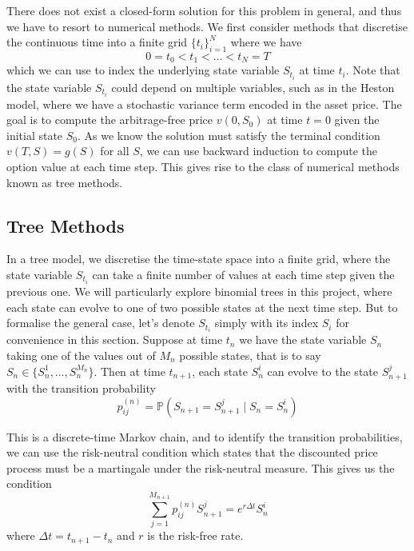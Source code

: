 There does not exist a closed-form solution for this problem in general, and thus we have to resort to numerical methods. We first consider methods that discretise the continuous time into a finite grid $\{t_i\}_{i=1}^N$ where we have
\begin{equation}
    0 = t_0 < t_1 < \dots < t_N = T
\end{equation}
which we can use to index the underlying state variable $S_{t_i}$ at time $t_i$. Note that the state variable $S_{t_i}$ could depend on multiple variables, such as in the Heston model, where we have a stochastic variance term encoded in the asset price. The goal is to compute the arbitrage-free price $v(0, S_0)$ at time $t=0$ given the initial state $S_0$. As we know the solution must satisfy the terminal condition $v(T, S) = g(S)$ for all $S$, we can use backward induction to compute the option value at each time step. This gives rise to the class of numerical methods known as tree methods.

\subsection{Tree Methods}

In a tree model, we discretise the time-state space into a finite grid, where the state variable $S_{t_i}$ can take a finite number of values at each time step given the previous one. We will particularly explore binomial trees in this project, where each state can evolve to one of two possible states at the next time step. But to formalise the general case, let's denote $S_{t_i}$ simply with its index $S_i$ for convenience in this section. Suppose at time $t_n$ we have the state variable $S_n$ taking one of the values out of $M_n$ possible states, that is to say $S_n \in \{S_n^1, \dots, S_n^{M_n}\}$. Then at time $t_{n+1}$, each state $S_n^i$ can evolve to the state $S_{n+1}^j$ with the transition probability
\begin{equation}
    p_{ij}^{(n)} = \mathbb P(S_{n+1} = S_{n+1}^j \mid S_n = S_n^i)
\end{equation}

This is a discrete-time Markov chain, and to identify the transition probabilities, we can use the risk-neutral condition which states that the discounted price process must be a martingale under the risk-neutral measure. This gives us the condition
\begin{equation}
    \sum_{j=1}^{M_{n+1}} p_{ij}^{(n)} S_{n+1}^j = e^{r\Delta t} S_n^i
\end{equation}
where $\Delta t = t_{n+1} - t_n$ and $r$ is the risk-free rate.

